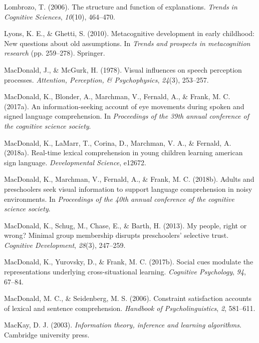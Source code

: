 \documentclass[oneside]{report}
\begin{document}
\hypertarget{ref-lombrozo2006structure}{}
Lombrozo, T. (2006). The structure and function of explanations.
\emph{Trends in Cognitive Sciences}, \emph{10}(10), 464--470.

\hypertarget{ref-lyons2010metacognitive}{}
Lyons, K. E., \& Ghetti, S. (2010). Metacognitive development in early
childhood: New questions about old assumptions. In \emph{Trends and
prospects in metacognition research} (pp. 259--278). Springer.

\hypertarget{ref-macdonald1978visual}{}
MacDonald, J., \& McGurk, H. (1978). Visual influences on speech
perception processes. \emph{Attention, Perception, \& Psychophysics},
\emph{24}(3), 253--257.

\hypertarget{ref-macdonald2017info}{}
MacDonald, K., Blonder, A., Marchman, V., Fernald, A., \& Frank, M. C.
(2017a). An information-seeking account of eye movements during spoken
and signed language comprehension. In \emph{Proceedings of the 39th
annual conference of the cognitive science society}.

\hypertarget{ref-macdonald2018real}{}
MacDonald, K., LaMarr, T., Corina, D., Marchman, V. A., \& Fernald, A.
(2018a). Real-time lexical comprehension in young children learning
american sign language. \emph{Developmental Science}, e12672.

\hypertarget{ref-macdonald2018noise}{}
MacDonald, K., Marchman, V., Fernald, A., \& Frank, M. C. (2018b).
Adults and preschoolers seek visual information to support language
comprehension in noisy environments. In \emph{Proceedings of the 40th
annual conference of the cognitive science society}.

\hypertarget{ref-macdonald2013my}{}
MacDonald, K., Schug, M., Chase, E., \& Barth, H. (2013). My people,
right or wrong? Minimal group membership disrupts preschoolers'
selective trust. \emph{Cognitive Development}, \emph{28}(3), 247--259.

\hypertarget{ref-macdonald2017social}{}
MacDonald, K., Yurovsky, D., \& Frank, M. C. (2017b). Social cues
modulate the representations underlying cross-situational learning.
\emph{Cognitive Psychology}, \emph{94}, 67--84.

\hypertarget{ref-macdonald2006constraint}{}
MacDonald, M. C., \& Seidenberg, M. S. (2006). Constraint satisfaction
accounts of lexical and sentence comprehension. \emph{Handbook of
Psycholinguistics}, \emph{2}, 581--611.

\hypertarget{ref-mackay2003information}{}
MacKay, D. J. (2003). \emph{Information theory, inference and learning
algorithms}. Cambridge university press.
\end{document}
